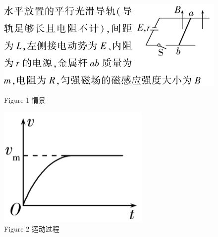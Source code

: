 \documentclass{article}
\begin{document}
\begin{figure}[H]
    \begin{minipage}{0.65\textwidth}
        \centering
        \includegraphics[width = \textwidth]{pictures/8.png}
        \caption*{Figure 1 情景}
    \end{minipage}
    \hfill
    \begin{minipage}{0.3\textwidth}
        \centering
        \includegraphics[width = \textwidth]{pictures/9.png}
        \caption*{Figure 2 运动过程}
    \end{minipage}
\end{figure}

\vspace{2em}
\end{document}
